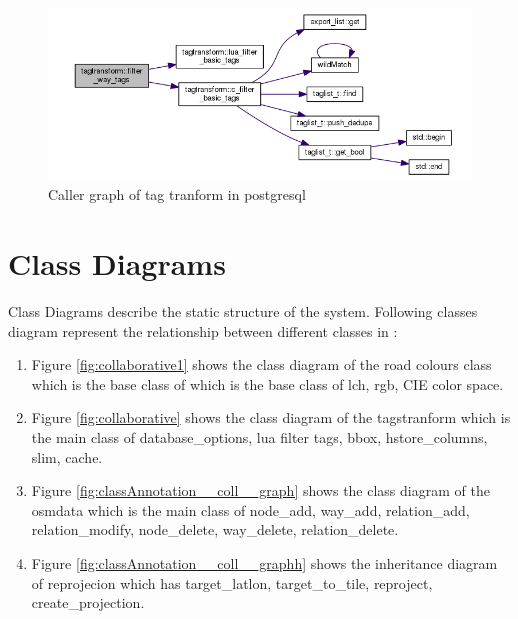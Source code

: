 \begin{figure}
\centering
\includegraphics[width=1\linewidth,height=1\columnwidth]{input/images/dep_tagtransform.png}
\caption{Caller graph of tag tranform in postgresql}
\label{fig:dependencyy}
\end{figure}


\section{Class Diagrams}
Class Diagrams describe the static structure of the system. Following classes diagram represent the relationship between different classes in :
\begin{enumerate}
	\item Figure \ref{fig:collaborative1} shows the class diagram of the road colours class which is the base class of which is the base class of lch, rgb, CIE color space.

	\item Figure \ref{fig:collaborative} shows the class diagram of the tagstranform which is the main class of database\_options, lua filter tags, bbox, hstore\_columns, slim, cache.
	
	\item Figure \ref{fig:classAnnotation__coll__graph}  shows the class diagram of the osmdata which is the main class of node\_add, way\_add, relation\_add, relation\_modify, node\_delete, way\_delete, relation\_delete.

	\item Figure \ref{fig:classAnnotation__coll__graphh}  shows the inheritance diagram of reprojecion which has target\_latlon, target\_to\_tile, reproject, create\_projection.
\end{enumerate}

